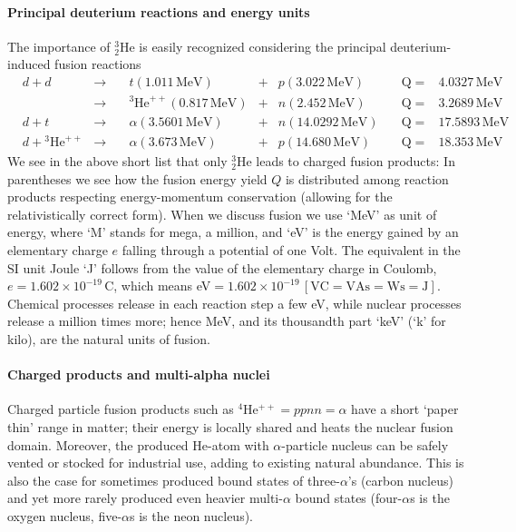 \documentclass[particles,article,accept,pdftex,moreauthors]{Definitions/mdpi}
\begin{document}
\paragraph*{\bf Principal deuterium reactions and energy units}
The importance of ${}^3_2$He is easily recognized considering the principal deuterium-induced fusion reactions 
\begin{align}
&d+d&\to& \quad \label{eq:ddQp}
t (1.011\,\mathrm{MeV}) &+& p (3.022\,\mathrm{MeV})\quad &\mathrm{Q}=&4.0327\,\mathrm{MeV}\\
&&\to& \quad {}^3\mathrm{He}^{++} (0.817\,\mathrm{MeV})&+& n 	(2.452\,\mathrm{MeV})\quad &\mathrm{Q}=&3.2689\,\mathrm{MeV}\label{eq:ddQn}\\
&d+t&\to& \quad \label{eq:dtQ}
\alpha (3.5601\,\mathrm{MeV}) &+& n 	(14.0292\,\mathrm{MeV})\quad &\mathrm{Q}=&17.5893\,\mathrm{MeV}\\
&d+{}^3\mathrm{He}^{++} &\to & \quad \alpha (3.673\,\mathrm{MeV}) &+& p (14.680\,\mathrm{MeV}) \quad &\mathrm{Q}=&18.353\,\mathrm{MeV}\label{eq:dHeQ}
\end{align}
We see in the above short list that only ${}^3_2$He leads to charged fusion products: In parentheses we see how the fusion energy yield $Q$ is distributed among reaction products respecting energy-momentum conservation (allowing for the relativistically correct form). When we discuss fusion we use `MeV' as unit of energy, where `M' stands for mega, a million, and `eV' is the energy gained by an elementary charge $e$ falling through a potential of one Volt. The equivalent in the SI unit Joule `J' follows from the value of the elementary charge in Coulomb, $e=1.602\times 10^{-19}\,\mathrm{C}$, which means eV$=1.602\times 10^{-19}\,\mathrm{[VC=VAs=Ws=J]}$. Chemical processes release in each reaction step a few eV, while nuclear processes release a million times more; hence MeV, and its thousandth part `keV' (`k' for kilo), are the natural units of fusion.

\paragraph*{\bf Charged products and multi-alpha nuclei}
Charged particle fusion products such as ${}^{4\!}$He${}^{++} =ppnn=\alpha$ have a short `paper thin' range in matter; their energy is locally shared and heats the nuclear fusion domain. Moreover, the produced He-atom with $\alpha$-particle nucleus can be safely vented or stocked for industrial use, adding to existing natural abundance. This is also the case for sometimes produced bound states of three-$\alpha$'s (carbon nucleus) and yet more rarely produced even heavier multi-$\alpha$ bound states (four-$\alpha$s is the oxygen nucleus, five-$\alpha$s is the neon nucleus).
\end{document}
